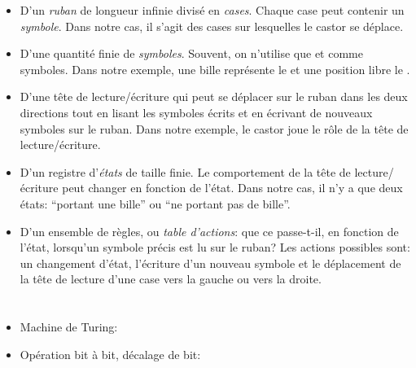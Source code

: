 {{\begin{itemize}
  \item D’un \emph{ruban} de longueur infinie divisé en \emph{cases}. Chaque case peut contenir un \emph{symbole}. Dans notre cas, il s’agit des cases sur lesquelles le castor se déplace.
  \item D’une quantité finie de \emph{symboles}. Souvent, on n’utilise que  et  comme symboles. Dans notre exemple, une bille représente le  et une position libre le .
  \item D’une tête de lecture/écriture qui peut se déplacer sur le ruban dans les deux directions tout en lisant les symboles écrits et en écrivant de nouveaux symboles sur le ruban. Dans notre exemple, le castor joue le rôle de la tête de lecture/écriture.
  \item D’un registre d’\emph{états} de taille finie. Le comportement de la tête de lecture/écriture peut changer en fonction de l’état. Dans notre cas, il n’y a que deux états: “portant une bille” ou “ne portant pas de bille”.
  \item D’un ensemble de règles, ou \emph{table d’actions}: que ce passe-t-il, en fonction de l’état, lorsqu’un symbole précis est lu sur le ruban? Les actions possibles sont: un changement d’état, l’écriture d’un nouveau symbole et le déplacement de la tête de lecture d’une case vers la gauche ou vers la droite.
\end{itemize}



\section*{\BrochureWebsitesAndKeywords}
{\raggedright
\begin{itemize}
  \item Machine de Turing: \href{https://fr.wikipedia.org/wiki/Machine_de_Turing}{}
  \item Opération bit à bit, décalage de bit: \href{https://fr.wikipedia.org/wiki/Op\%C3\%A9ration_bit_\%C3\%A0_bit\#D\%C3\%A9calages_de_bit}{}
\end{itemize}


}

}{}

}
